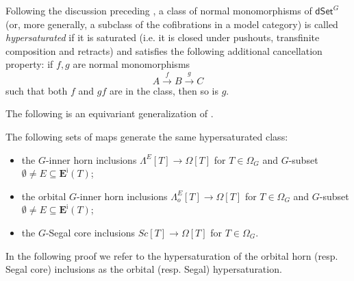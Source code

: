 \documentclass[a4paper,10pt
,draft
]{article}%
\begin{document}
Following the discussion preceding \cite[Prop. 3.6.8]{HHM16},
a class of normal monomorphisms of $\mathsf{dSet}^G$
(or, more generally, a subclass of the cofibrations in a model category) is called
\textit{hypersaturated} if it is saturated (i.e. it is closed under
pushouts, transfinite composition and retracts) and satisfies the following additional cancellation property: 
if $f,g$ are normal monomorphisms
\begin{equation}\label{CANCEL_EQ}
A \xrightarrow{f} B \xrightarrow{g} C
\end{equation}
such that both $f$ and $gf$ are in the class, then so is $g$.

The following is an equivariant generalization of 
\cite[Props. 2.4 and 2.5]{CM13a}.


\begin{proposition}\label{HYPER PROP}
The following sets of maps generate the same hypersaturated class:
\begin{itemize}
\item the $G$-inner horn inclusions
$\Lambda^{E} [T] \to \Omega[T]$ for $T \in \Omega_G$ and 
$G$-subset $\emptyset \neq E \subseteq \boldsymbol{E}^{\mathsf{i}}(T)$; 
\item the orbital $G$-inner horn inclusions
$\Lambda^{E}_o [T] \to \Omega[T]$ for $T \in \Omega_G$ and 
$G$-subset $\emptyset \neq E \subseteq \boldsymbol{E}^{\mathsf{i}}(T)$; 
\item the $G$-Segal core inclusions
$Sc[T] \to \Omega[T]$ for $T \in \Omega_G$.
\end{itemize}
\end{proposition}

In the following proof we refer to the hypersaturation
of the orbital horn (resp. Segal core) inclusions as the orbital (resp. Segal) hypersaturation.
\end{document}
